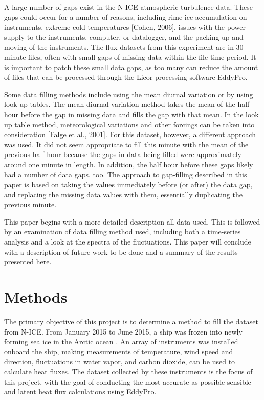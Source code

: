 A large number of gaps exist in the N-ICE atmospheric turbulence data. These gaps could occur for a number of reasons, including rime ice accumulation on instruments, extreme cold temperatures [Cohen, 2006], issues with the power supply to the instruments, computer, or datalogger, and the packing up and moving of the instruments. The flux datasets from this experiment are in 30-minute files, often with small gaps of missing data within the file time period. It is important to patch these small data gaps, as too many can reduce the amount of files that can be processed through the Licor processing software EddyPro. 

Some data filling methods include using the mean diurnal variation or by using look-up tables. The mean diurnal variation method takes the mean of the half-hour before the gap in missing data and fills the gap with that mean. In the look up table method, meteorological variations and other forcings can be taken into consideration [Falge et al., 2001]. For this dataset, however, a different approach was used. It did not seem appropriate to fill this minute with the mean of the previous half hour because the gaps in data being filled were approximately around one minute in length. In addition, the half hour before these gaps likely had a number of data gaps, too. The approach to gap-filling described in this paper is based on taking the values immediately before (or after) the data gap, and replacing the missing data values with them, essentially duplicating the previous minute.

This paper begins with a more detailed description all data used. This is followed by an examination of data filling method used, including both a time-series analysis and a look at the spectra of the fluctuations. This paper will conclude with a description of future work to be done and a summary of the results presented here. 

\section{Methods}
The primary objective of this project is to determine a method to fill the dataset from N-ICE. From January 2015 to June 2015, a ship was frozen into newly forming sea ice in the Arctic ocean \citep{granskog:2016}. An array of instruments was installed onboard the ship, making measurements of temperature, wind speed and direction, fluctuations in water vapor, and carbon dioxide, can be used to calculate heat fluxes. The dataset collected by these instruments is the focus of this project, with the goal of conducting the most accurate as possible sensible and latent heat flux calculations using EddyPro. 

